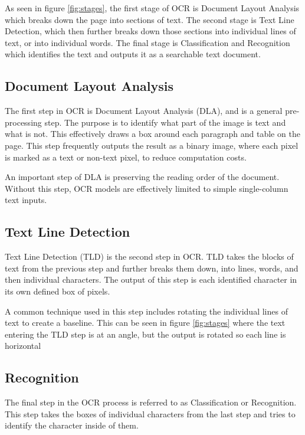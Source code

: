 \documentclass[sigplan,screen,nonacm]{acmart-tagged}
\begin{document}
As seen in figure \ref{fig:stages}, the first stage of OCR is Document Layout Analysis which breaks down the page into sections of text. The second stage is Text Line Detection, which then further breaks down those sections into individual lines of text, or into individual words. The final stage is Classification and Recognition which identifies the text and outputs it as a searchable text document.

\subsection{Document Layout Analysis}
\label{DLA}
The first step in OCR is Document Layout Analysis (DLA), and is a general pre-processing step. The purpose is to identify what part of the image is text and what is not. This effectively draws a box around each paragraph and table on the page.
This step frequently outputs the result as a binary image, where each pixel is marked as a text or non-text pixel, to reduce computation costs.

An important step of DLA is preserving the reading order of the document. Without this step, OCR models are effectively limited to simple single-column text inputs.

\subsection{Text Line Detection}
\label{TLD}
Text Line Detection (TLD) is the second step in OCR. TLD takes the blocks of text from the previous step and further breaks them down, into lines, words, and then individual characters. The output of this step is each identified character in its own defined box of pixels.

A common technique used in this step includes rotating the individual lines of text to create a baseline. This can be seen in figure \ref{fig:stages} where the text entering the TLD step is at an angle, but the output is rotated so each line is horizontal

\subsection{Recognition}
\label{Recognition}
The final step in the OCR process is referred to as Classification or Recognition. 
This step takes the boxes of individual characters from the last step and tries to identify the character inside of them.
\end{document}
